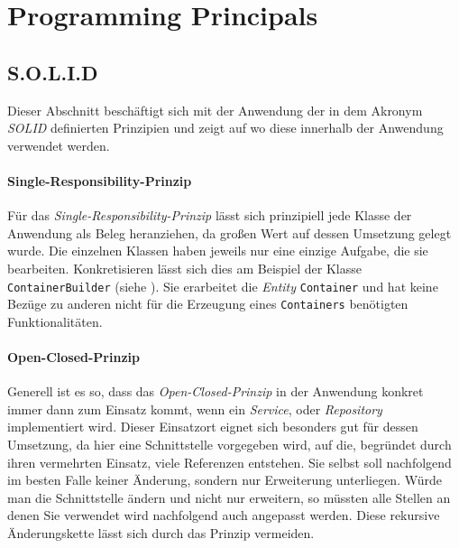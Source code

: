 \section{Programming Principals}
\label{sec:programming_principles}

\subsection{S.O.L.I.D}
\label{subsec:solid}

Dieser Abschnitt beschäftigt sich mit der Anwendung der in dem Akronym \emph{SOLID} definierten Prinzipien und zeigt auf wo diese innerhalb der Anwendung verwendet werden.

\paragraph{Single-Responsibility-Prinzip}

Für das \emph{Single-Responsibility-Prinzip} lässt sich prinzipiell jede Klasse der Anwendung als Beleg heranziehen, da großen Wert auf dessen Umsetzung gelegt wurde.
Die einzelnen Klassen haben jeweils nur eine einzige Aufgabe, die sie bearbeiten.
Konkretisieren lässt sich dies am Beispiel der Klasse \texttt{ContainerBuilder} (siehe ).
Sie erarbeitet die \emph{Entity} \texttt{Container} und hat keine Bezüge zu anderen nicht für die Erzeugung eines \texttt{Containers} benötigten Funktionalitäten.

\bgroup

    \label{lst:container_builder}
\egroup

\paragraph{Open-Closed-Prinzip}

Generell ist es so, dass das \emph{Open-Closed-Prinzip} in der Anwendung konkret immer dann zum Einsatz kommt, wenn ein \emph{Service}, oder \emph{Repository} implementiert wird.
Dieser Einsatzort eignet sich besonders gut für dessen Umsetzung, da hier eine Schnittstelle vorgegeben wird, auf die, begründet durch ihren vermehrten Einsatz, viele Referenzen entstehen. 
Sie selbst soll nachfolgend im besten Falle keiner Änderung, sondern nur Erweiterung unterliegen.
Würde man die Schnittstelle ändern und nicht nur erweitern, so müssten alle Stellen an denen Sie verwendet wird nachfolgend auch angepasst werden.
Diese rekursive Änderungskette lässt sich durch das Prinzip vermeiden.

